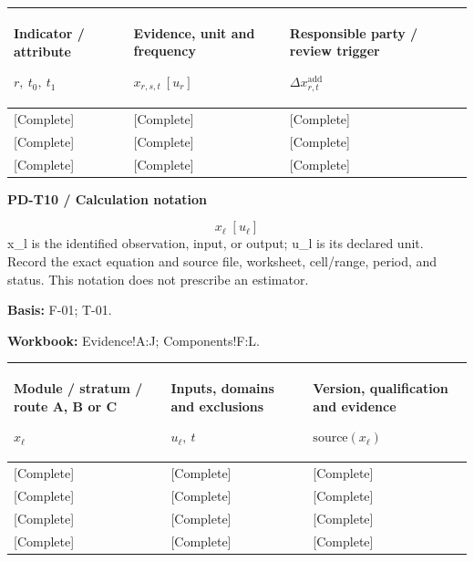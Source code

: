 {\sffamily\fontsize{8.3}{10.3}\selectfont\begin{longtable}{@{}P{56.09mm} P{57.74mm} P{51.14mm}@{}}
\toprule
\textbf{Indicator / attribute}\par {\normalfont\fontsize{8.2}{10}\selectfont $r,\ t_0,\ t_1$} & \textbf{Evidence, unit and frequency}\par {\normalfont\fontsize{8.2}{10}\selectfont $x_{r,s,t}\ [u_r]$} & \textbf{Responsible party / review trigger}\par {\normalfont\fontsize{8.2}{10}\selectfont $\Delta x_{r,t}^{\mathrm{add}}$}\\\midrule\endhead
\rule{0pt}{7.7mm}[Complete] & [Complete] & [Complete]\\\hline
\rule{0pt}{7.7mm}[Complete] & [Complete] & [Complete]\\\hline
\rule{0pt}{7.7mm}[Complete] & [Complete] & [Complete]\\\hline
\end{longtable}}
\par\begingroup\sffamily\fontsize{8}{10}\selectfont\color{NEBGreen}\setlength{\parskip}{2pt}\setlength{\abovedisplayskip}{4pt}\setlength{\belowdisplayskip}{4pt}\setlength{\abovedisplayshortskip}{2pt}\setlength{\belowdisplayshortskip}{3pt}
\textbf{PD-T10 / Calculation notation}\par
{\fontsize{9}{11}\selectfont\[ x_{\ell}\;[u_{\ell}] \]}
x\_l is the identified observation, input, or output; u\_l is its declared unit. Record the exact equation and source file, worksheet, cell/range, period, and status. This notation does not prescribe an estimator.\par
\textbf{Basis:} F-01; T-01.\par
\textbf{Workbook:} Evidence!A:J; Components!F:L.\par\endgroup
{\sffamily\fontsize{8.3}{10.3}\selectfont\begin{longtable}{@{}P{56.09mm} P{54.44mm} P{54.44mm}@{}}
\toprule
\textbf{Module / stratum / route A, B or C}\par {\normalfont\fontsize{8.2}{10}\selectfont $x_{\ell}$} & \textbf{Inputs, domains and exclusions}\par {\normalfont\fontsize{8.2}{10}\selectfont $u_{\ell},\ t$} & \textbf{Version, qualification and evidence}\par {\normalfont\fontsize{8.2}{10}\selectfont $\text{source}(x_{\ell})$}\\\midrule\endhead
\rule{0pt}{7.7mm}[Complete] & [Complete] & [Complete]\\\hline
\rule{0pt}{7.7mm}[Complete] & [Complete] & [Complete]\\\hline
\rule{0pt}{7.7mm}[Complete] & [Complete] & [Complete]\\\hline
\rule{0pt}{7.7mm}[Complete] & [Complete] & [Complete]\\\hline
\end{longtable}}
